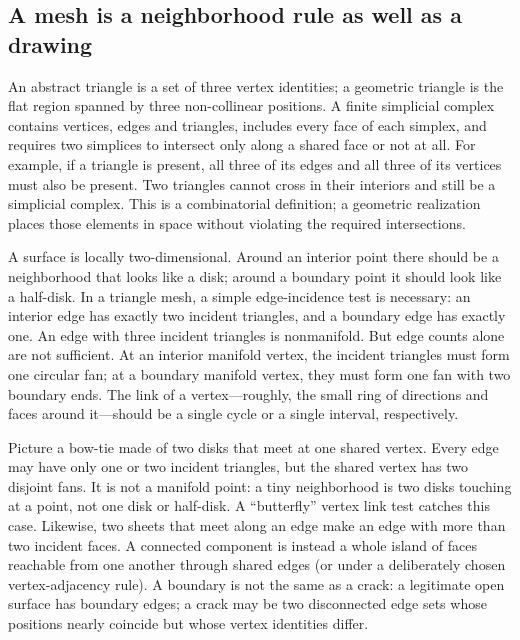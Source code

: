 \subsection{A mesh is a neighborhood rule as well as a drawing}\label{03-visual-computing-i-ch002-a-mesh-is-a-neighborhood-rule-as-well-as-a-drawing}

An abstract triangle is a set of three vertex identities; a geometric triangle is the flat region spanned by three non-collinear positions. A finite simplicial complex contains vertices, edges and triangles, includes every face of each simplex, and requires two simplices to intersect only along a shared face or not at all. For example, if a triangle is present, all three of its edges and all three of its vertices must also be present. Two triangles cannot cross in their interiors and still be a simplicial complex. This is a combinatorial definition; a geometric realization places those elements in space without violating the required intersections.

A surface is locally two-dimensional. Around an interior point there should be a neighborhood that looks like a disk; around a boundary point it should look like a half-disk. In a triangle mesh, a simple edge-incidence test is necessary: an interior edge has exactly two incident triangles, and a boundary edge has exactly one. An edge with three incident triangles is nonmanifold. But edge counts alone are not sufficient. At an interior manifold vertex, the incident triangles must form one circular fan; at a boundary manifold vertex, they must form one fan with two boundary ends. The link of a vertex---roughly, the small ring of directions and faces around it---should be a single cycle or a single interval, respectively.

Picture a bow-tie made of two disks that meet at one shared vertex. Every edge may have only one or two incident triangles, but the shared vertex has two disjoint fans. It is not a manifold point: a tiny neighborhood is two disks touching at a point, not one disk or half-disk. A ``butterfly'' vertex link test catches this case. Likewise, two sheets that meet along an edge make an edge with more than two incident faces. A connected component is instead a whole island of faces reachable from one another through shared edges (or under a deliberately chosen vertex-adjacency rule). A boundary is not the same as a crack: a legitimate open surface has boundary edges; a crack may be two disconnected edge sets whose positions nearly coincide but whose vertex identities differ.

